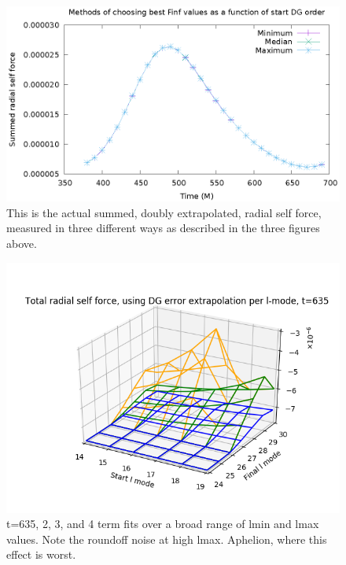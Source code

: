 \begin{figure}
  \includegraphics{bestfinfscriptplot.eps}
  \caption{This is the actual summed, doubly extrapolated, radial self force, measured in three different ways as described in the three figures above.}
\end{figure}



\begin{figure}
  \includegraphics{bestfinflminlmax234terms635fullrange_perihelion}
  \caption{t=635, 2, 3, and 4 term fits over a broad range of lmin and lmax values. Note the roundoff noise at high lmax. Aphelion, where this effect is worst.}
\end{figure}

